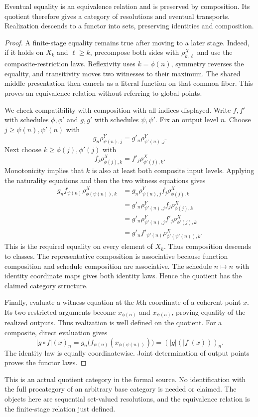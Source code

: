 \begin{theorem}\label{KS61}
Eventual equality is an equivalence relation and is preserved by composition. Its quotient therefore gives a category of resolutions and eventual transports. Realization descends to a functor into sets, preserving identities and composition.
\end{theorem}
\begin{proof}
A finite-stage equality remains true after moving to a later stage. Indeed, if it holds on $X_k$ and $\ell\ge k$, precompose both sides with $\rho^X_{k,\ell}$ and use the composite-restriction laws. Reflexivity uses $k=\phi(n)$, symmetry reverses the equality, and transitivity moves two witnesses to their maximum. The shared middle presentation then cancels as a literal function on that common fiber. This proves an equivalence relation without referring to global points.

We check compatibility with composition with all indices displayed. Write $f,f'$ with schedules $\phi,\phi'$ and $g,g'$ with schedules $\psi,\psi'$. Fix an output level $n$. Choose $j\ge\psi(n),\psi'(n)$ with
\[
 g_n\rho^Y_{\psi(n),j}=g'_n\rho^Y_{\psi'(n),j}.
\]
Next choose $k\ge\phi(j),\phi'(j)$ with
\[
 f_j\rho^X_{\phi(j),k}=f'_j\rho^X_{\phi'(j),k}.
\]
Monotonicity implies that $k$ is also at least both composite input levels. Applying the naturality equations and then the two witness equations gives
\[
\begin{aligned}
 g_nf_{\psi(n)}\rho^X_{\phi(\psi(n)),k}
 &=g_n\rho^Y_{\psi(n),j}f_j\rho^X_{\phi(j),k}\\
 &=g'_n\rho^Y_{\psi'(n),j}f_j\rho^X_{\phi(j),k}\\
 &=g'_n\rho^Y_{\psi'(n),j}f'_j\rho^X_{\phi'(j),k}\\
 &=g'_nf'_{\psi'(n)}\rho^X_{\phi'(\psi'(n)),k}.
\end{aligned}
\]
This is the required equality on every element of $X_k$. Thus composition descends to classes. The representative composition is associative because function composition and schedule composition are associative. The schedule $n\mapsto n$ with identity coordinate maps gives both identity laws. Hence the quotient has the claimed category structure.

Finally, evaluate a witness equation at the $k$th coordinate of a coherent point $x$. Its two restricted arguments become $x_{\phi(n)}$ and $x_{\psi(n)}$, proving equality of the realized outputs. Thus realization is well defined on the quotient. For a composite, direct evaluation gives
\[
 |g\circ f|(x)_n=g_n\bigl(f_{\psi(n)}(x_{\phi(\psi(n))})\bigr)
 =(|g|(|f|(x)))_n.
\]
The identity law is equally coordinatewise. Joint determination of output points proves the functor laws.
\end{proof}
This is an actual quotient category in the formal source. No identification with the full procategory of an arbitrary base category is needed or claimed. The objects here are sequential set-valued resolutions, and the equivalence relation is the finite-stage relation just defined.

